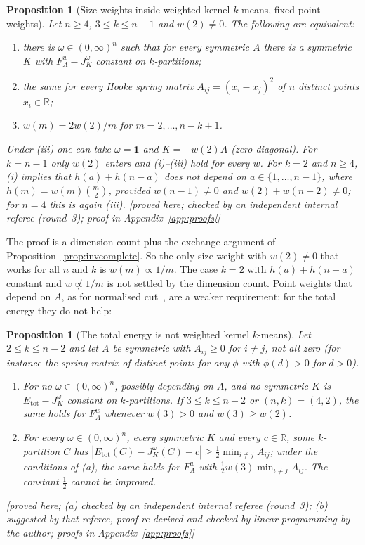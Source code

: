 \documentclass[11pt,a4paper]{article}
\theoremstyle{plain}
\newtheorem{proposition}[theorem]{Proposition}
\theoremstyle{definition}
\theoremstyle{remark}
\newcommand{\R}{\mathbb{R}}
\newcommand{\tot}{\mathrm{tot}}
\newcommand{\one}{\mathbf 1}
\newcommand{\status}[1]{\textsf{\small [#1]}}
\newcommand{\rthree}{checked by an independent internal referee (round~3)}
\begin{document}
\begin{proposition}[Size weights inside weighted kernel $k$-means, fixed point weights]\label{prop:weights}
Let $n\ge4$, $3\le k\le n-1$ and $w(2)\ne0$. The following are equivalent:
\begin{enumerate}[label=(\roman*),leftmargin=2em]
\item there is $\omega\in(0,\infty)^n$ such that for every symmetric $A$ there is a symmetric $K$ with $F^w_A-J^\omega_K$ constant on $k$-partitions;
\item the same for every Hooke spring matrix $A_{ij}=(x_i-x_j)^2$ of $n$ distinct points $x_i\in\R$;
\item $w(m)=2w(2)/m$ for $m=2,\dots,n-k+1$.
\end{enumerate}
Under (iii) one can take $\omega=\one$ and $K=-w(2)A$ (zero diagonal). For $k=n-1$ only $w(2)$ enters and (i)--(iii) hold for every $w$. For $k=2$ and $n\ge4$, (i) implies that $h(a)+h(n-a)$ does not depend on $a\in\{1,\dots,n-1\}$, where $h(m)=w(m)\binom m2$, provided $w(n-1)\ne0$ and $w(2)+w(n-2)\ne0$; for $n=4$ this is again (iii). \status{proved here; \rthree; proof in Appendix~\ref{app:proofs}}
\end{proposition}

\noindent The proof is a dimension count plus the exchange argument of Proposition~\ref{prop:invcomplete}. So the only size weight with $w(2)\ne0$ that works for all $n$ and $k$ is $w(m)\propto1/m$. The case $k=2$ with $h(a)+h(n-a)$ constant and $w\not\propto1/m$ is not settled by the dimension count. Point weights that depend on $A$, as for normalised cut~\citep{dhillon2004,dhillon2007}, are a weaker requirement; for the total energy they do not help:

\begin{proposition}[The total energy is not weighted kernel $k$-means]\label{prop:weightsdd}
Let $2\le k\le n-2$ and let $A$ be symmetric with $A_{ij}\ge0$ for $i\ne j$, not all zero (for instance the spring matrix of distinct points for any $\phi$ with $\phi(d)>0$ for $d>0$).
\begin{enumerate}[label=(\alph*),leftmargin=2em]
\item For no $\omega\in(0,\infty)^n$, possibly depending on $A$, and no symmetric $K$ is $E_\tot-J^\omega_K$ constant on $k$-partitions. If $3\le k\le n-2$ or $(n,k)=(4,2)$, the same holds for $F^w_A$ whenever $w(3)>0$ and $w(3)\ge w(2)$.
\item For every $\omega\in(0,\infty)^n$, every symmetric $K$ and every $c\in\R$, some $k$-partition $C$ has $|E_\tot(C)-J^\omega_K(C)-c|\ge\tfrac12\min_{i\ne j}A_{ij}$; under the conditions of (a), the same holds for $F^w_A$ with $\tfrac12w(3)\min_{i\ne j}A_{ij}$. The constant $\tfrac12$ cannot be improved.
\end{enumerate}
\status{proved here; (a) \rthree; (b) suggested by that referee, proof re-derived and checked by linear programming by the author; proofs in Appendix~\ref{app:proofs}}
\end{proposition}
\end{document}
